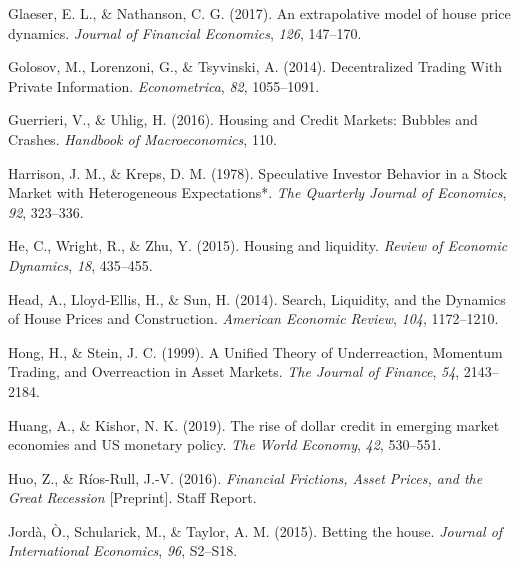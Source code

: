 \documentclass[
  12pt,
]{article}
\newlength{\cslhangindent}
\newlength{\cslentryspacingunit} %
\newenvironment{CSLReferences}[2] %
 {%
  \setlength{\parindent}{0pt}
  \ifodd #1
  \let\oldpar\par
  \def\par{\hangindent=\cslhangindent\oldpar}
  \fi
  \setlength{\parskip}{#2\cslentryspacingunit}
 }%
 {}
\begin{document}
\begin{CSLReferences}{1}{0}
\leavevmode{}%
Glaeser, E. L., \& Nathanson, C. G. (2017). An extrapolative model of house price dynamics. \emph{Journal of Financial Economics}, \emph{126}, 147--170.

\leavevmode{}%
Golosov, M., Lorenzoni, G., \& Tsyvinski, A. (2014). Decentralized {Trading With Private Information}. \emph{Econometrica}, \emph{82}, 1055--1091.

\leavevmode{}%
Guerrieri, V., \& Uhlig, H. (2016). Housing and {Credit Markets}: {Bubbles} and {Crashes}. \emph{Handbook of Macroeconomics}, 110.

\leavevmode{}%
Harrison, J. M., \& Kreps, D. M. (1978). Speculative {Investor Behavior} in a {Stock Market} with {Heterogeneous Expectations}*. \emph{The Quarterly Journal of Economics}, \emph{92}, 323--336.

\leavevmode{}%
He, C., Wright, R., \& Zhu, Y. (2015). Housing and liquidity. \emph{Review of Economic Dynamics}, \emph{18}, 435--455.

\leavevmode{}%
Head, A., Lloyd-Ellis, H., \& Sun, H. (2014). Search, {Liquidity}, and the {Dynamics} of {House Prices} and {Construction}. \emph{American Economic Review}, \emph{104}, 1172--1210.

\leavevmode{}%
Hong, H., \& Stein, J. C. (1999). A {Unified Theory} of {Underreaction}, {Momentum Trading}, and {Overreaction} in {Asset Markets}. \emph{The Journal of Finance}, \emph{54}, 2143--2184.

\leavevmode{}%
Huang, A., \& Kishor, N. K. (2019). The rise of dollar credit in emerging market economies and {US} monetary policy. \emph{The World Economy}, \emph{42}, 530--551.

\leavevmode{}%
Huo, Z., \& Ríos-Rull, J.-V. (2016). \emph{Financial {Frictions}, {Asset Prices}, and the {Great Recession}} {[}Preprint{]}. {Staff Report}.

\leavevmode{}%
Jordà, Ò., Schularick, M., \& Taylor, A. M. (2015). Betting the house. \emph{Journal of International Economics}, \emph{96}, S2--S18.


\end{CSLReferences}
\end{document}
